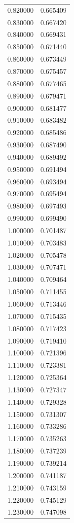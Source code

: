 \begin{tabular}{rr}
0.820000 & 0.665409 \\
0.830000 & 0.667420 \\
0.840000 & 0.669431 \\
0.850000 & 0.671440 \\
0.860000 & 0.673449 \\
0.870000 & 0.675457 \\
0.880000 & 0.677465 \\
0.890000 & 0.679471 \\
0.900000 & 0.681477 \\
0.910000 & 0.683482 \\
0.920000 & 0.685486 \\
0.930000 & 0.687490 \\
0.940000 & 0.689492 \\
0.950000 & 0.691494 \\
0.960000 & 0.693494 \\
0.970000 & 0.695494 \\
0.980000 & 0.697493 \\
0.990000 & 0.699490 \\
1.000000 & 0.701487 \\
1.010000 & 0.703483 \\
1.020000 & 0.705478 \\
1.030000 & 0.707471 \\
1.040000 & 0.709464 \\
1.050000 & 0.711455 \\
1.060000 & 0.713446 \\
1.070000 & 0.715435 \\
1.080000 & 0.717423 \\
1.090000 & 0.719410 \\
1.100000 & 0.721396 \\
1.110000 & 0.723381 \\
1.120000 & 0.725364 \\
1.130000 & 0.727347 \\
1.140000 & 0.729328 \\
1.150000 & 0.731307 \\
1.160000 & 0.733286 \\
1.170000 & 0.735263 \\
1.180000 & 0.737239 \\
1.190000 & 0.739214 \\
1.200000 & 0.741187 \\
1.210000 & 0.743159 \\
1.220000 & 0.745129 \\
1.230000 & 0.747098 \\

\end{tabular}
